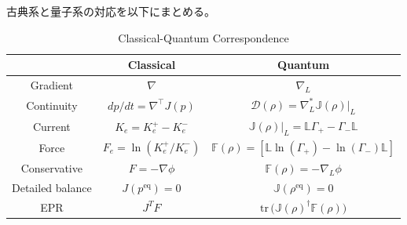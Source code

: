 \documentclass[a4paper,11pt]{jsarticle}
\numberwithin{equation}{section}
\begin{document}
古典系と量子系の対応を以下にまとめる。
\begin{table}[H]
\centering
\renewcommand{\arraystretch}{1.5}
\setlength{\tabcolsep}{8pt}
\begin{tabular}{|c|c|c|}
\hline
 & Classical & Quantum \\
\hline
Gradient & $\nabla$ & $\nabla_{L}$ \\
\hline
Continuity & $dp/dt = \nabla^{\top}J(p)$ & $\mathcal{D}(\rho) = \nabla_{L}^{*}\mathbb{J}(\rho)|_{L}$ \\
\hline
Current & $K_{e} = K_{e}^{+} - K_{e}^{-}$ & $\mathbb{J}(\rho)|_{L} =\mathbb{L}\Gamma_+-\Gamma_{-}\mathbb{L}$ \\
\hline
Force & $F_{e} = \ln(K_{e}^{+}/K_{e}^{-})$ & $\mathbb{F}(\rho) = [\mathbb{L}\ln(\Gamma_+)-\ln(\Gamma_{-})\mathbb{L}]$ \\
\hline
Conservative & $F = -\nabla \phi$ & $\mathbb{F}(\rho) = -\nabla_{L}\phi$ \\
\hline
Detailed balance & $J(p^{\mathrm{eq}}) = 0$ & $\mathbb{J}(\rho^{\mathrm{eq}}) = 0$ \\
\hline
EPR & $J^{T}F$ & $\mathrm{tr}\,\bigl(\mathbb{J}(\rho)^{\dagger}\mathbb{F}(\rho)\bigr)$ \\
\hline
\end{tabular}
\caption{Classical-Quantum Correspondence}
\end{table}
\end{document}
